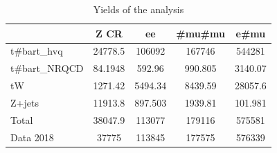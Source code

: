 \documentclass[10pt]{article}
\begin{document}
\begin{table}[htbp]
\begin{center}
\begin{tabular}{|l|S|S|S|S|}
\hline 
 & {Z CR} & {ee} & {#mu#mu} & {e#mu}\\
\hline 
  t#bar{t}_{hvq}   & 24778.5  & 106092  & 167746  & 544281  \\ 
  t#bar{t}_{NRQCD}   & 84.1948  & 592.96  & 990.805  & 3140.07  \\ 
  tW   & 1271.42  & 5494.34  & 8439.59  & 28057.6  \\ 
  Z+jets   & 11913.8  & 897.503  & 1939.81  & 101.981  \\ 
\hline 
  Total  & 38047.9  & 113077  & 179116  & 575581  \\ 
\hline 
  Data 2018   & 37775 & 113845 & 177575 & 576339 \\ 
\hline 
\end{tabular} 
\caption{Yields of the analysis} 
\end{center} 
\end{table} 
\end{document}
